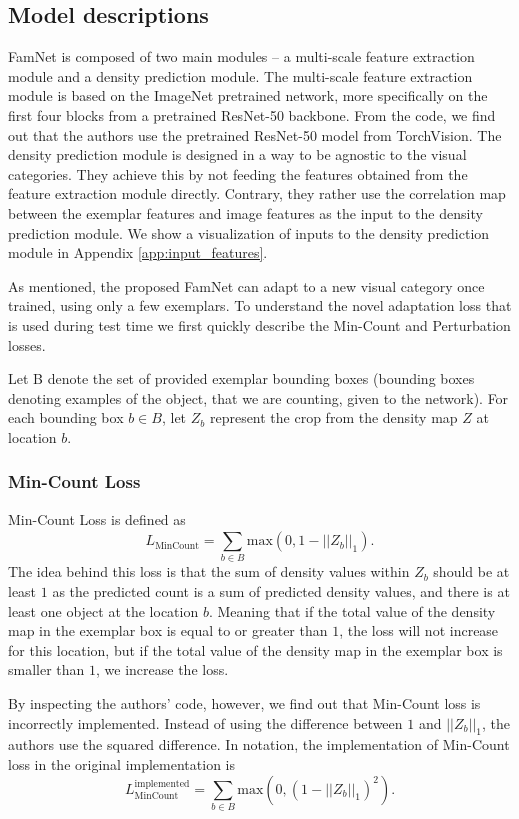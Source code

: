 \subsection{Model descriptions}
FamNet is composed of two main modules -- a multi-scale feature extraction module and a density prediction module. 
The multi-scale feature extraction module is based on the ImageNet pretrained network, more specifically on the first four blocks from a pretrained ResNet-50 backbone. From the code, we find out that the authors use the pretrained ResNet-50 model from TorchVision.
The density prediction module is designed in a way to be agnostic to the visual categories. They achieve this by not feeding the features obtained from the feature extraction module directly. Contrary, they rather use the correlation map between the exemplar features and image features as the input to the density prediction module. We show a visualization of inputs to the density prediction module in Appendix \ref{app:input_features}.

As mentioned, the proposed FamNet can adapt to a new visual category once trained, using only a few exemplars. To understand the novel adaptation loss that is used during test time we first quickly describe the Min-Count and Perturbation losses.

Let B denote the set of provided exemplar bounding boxes (bounding boxes denoting examples of the object, that we are counting, given to the network). For each bounding box $b \in B$, let $Z_b$ represent the crop from the density map $Z$ at location $b$. 


\subsubsection{Min-Count Loss}
\label{sec:min_count}
Min-Count Loss is defined as
\begin{equation}
L_{\text{MinCount}} = \sum_{b \in B}^{} \text{max} (0, 1 - ||Z_b||_1).
\end{equation}
The idea behind this loss is that the sum of density values within $Z_b$ should be at least $1$ as the predicted count is a sum of predicted density values, and there is at least one object at the location $b$. Meaning that if the total value of the density map in the exemplar box is equal to or greater than $1$, the loss will not increase for this location, but if the total value of the density map in the exemplar box is smaller than $1$, we increase the loss.

By inspecting the authors' code, however, we find out that Min-Count loss is incorrectly implemented. Instead of using the difference between $1$ and $||Z_b||_1$, the authors use the squared difference. In notation, the implementation of Min-Count loss in the original implementation is
\begin{equation}
L_{\text{MinCount}}^{\text{implemented}} = \sum_{b \in B}^{} \text{max} (0, (1 - ||Z_b||_1)^2).
\end{equation}

